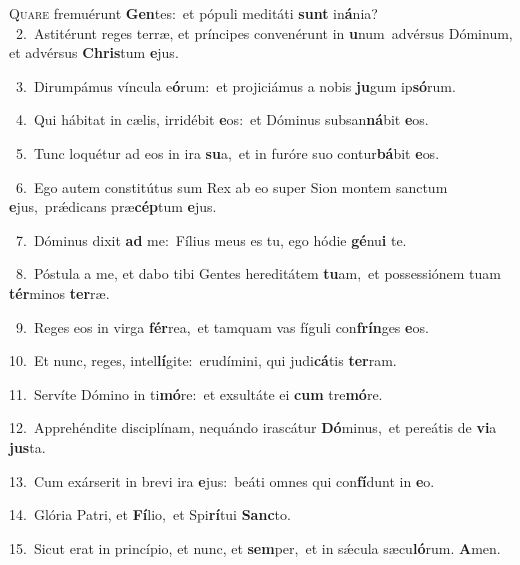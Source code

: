\lettrine{\initial\textcolor{\initialcolor}{Q}}{uare} fremuérunt \textbf{Gen}\-tes:~\star et pópuli meditáti \textbf{sunt} in\-\textbf{á}\-nia?\\
{\numbfont\textcolor{\numbcolor}{~2.}}~Astitérunt reges terræ, et príncipes convenérunt in \textbf{u}\-num~\star advérsus Dóminum, et advérsus \textbf{Chris}\-tum \textbf{e}\-jus.\par
{\numbfont\textcolor{\numbcolor}{~3.}}~Dirumpámus víncula e\-\textbf{ó}\-rum:~\star et projiciámus a nobis \textbf{ju}\-gum ip\-\textbf{só}\-rum.\par
{\numbfont\textcolor{\numbcolor}{~4.}}~Qui hábitat in cælis, irridébit \textbf{e}\-os:~\star et Dóminus subsan\-\textbf{ná}\-bit \textbf{e}\-os.\par
{\numbfont\textcolor{\numbcolor}{~5.}}~Tunc loquétur ad eos in ira \textbf{su}\-a,~\star et in furóre suo contur\-\textbf{bá}\-bit \textbf{e}\-os.\par
{\numbfont\textcolor{\numbcolor}{~6.}}~Ego autem constitútus sum Rex ab eo super Sion montem sanctum \textbf{e}\-jus,~\star prǽdicans præ\-\textbf{cép}\-tum \textbf{e}\-jus.\par
{\numbfont\textcolor{\numbcolor}{~7.}}~Dóminus dixit \textbf{ad} me:~\star Fílius meus es tu, ego hódie \textbf{gé}\-nu\textbf{i} te.\par
{\numbfont\textcolor{\numbcolor}{~8.}}~Póstula a me, et dabo tibi Gentes hereditátem \textbf{tu}\-am,~\star et possessiónem tuam \textbf{tér}\-minos \textbf{ter}\-ræ.\par
{\numbfont\textcolor{\numbcolor}{~9.}}~Reges eos in virga \textbf{fér}\-rea,~\star et tamquam vas fíguli con\-\textbf{frín}\-ges \textbf{e}\-os.\par
{\numbfont\textcolor{\numbcolor}{10.}}~Et nunc, reges, intel\-\textbf{lí}\-gite:~\star erudímini, qui judi\-\textbf{cá}\-tis \textbf{ter}\-ram.\par
{\numbfont\textcolor{\numbcolor}{11.}}~Servíte Dómino in ti\-\textbf{mó}\-re:~\star et exsultáte ei \textbf{cum} tre\-\textbf{mó}\-re.\par
{\numbfont\textcolor{\numbcolor}{12.}}~Apprehéndite disciplínam, nequándo irascátur \textbf{Dó}\-minus,~\star et pereátis de \textbf{vi}\-a \textbf{jus}\-ta.\par
{\numbfont\textcolor{\numbcolor}{13.}}~Cum exárserit in brevi ira \textbf{e}\-jus:~\star beáti omnes qui con\-\textbf{fí}\-dunt in \textbf{e}\-o.\par
{\numbfont\textcolor{\numbcolor}{14.}}~Glória Patri, et \textbf{Fí}\-lio,~\star et Spi\-\textbf{rí}\-tui \textbf{Sanc}\-to.\par
{\numbfont\textcolor{\numbcolor}{15.}}~Sicut erat in princípio, et nunc, et \textbf{sem}\-per,~\star et in sǽcula sæcu\-\textbf{ló}\-rum. \textbf{A}\-men.\par
